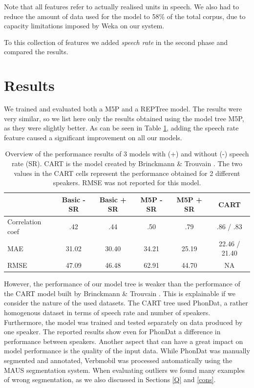 \documentclass[11pt,a4paper]{scrbook}
\begin{document}
Note that all features refer to actually realised units in speech. We also had to reduce the amount of data used for the model to 58\% of the total corpus, due to capacity limitations imposed by Weka on our system. 

To this collection of features we added \textit{speech rate} in the second phase and compared the results. 

\section{Results}
\label{chap_6:results}
We trained and evaluated both a M5P and a REPTree model. The results were very similar, so we list here only the results obtained using the model tree M5P, as they were slightly better. As can be seen in Table \ref{tab:perfM}, adding the speech rate feature caused a significant improvement on all our models. 

\begin{table}[htbp]
\centering
\begin{tabular}{|l|c|c|c|c|c|}

\hline
	 & Basic - SR & Basic + SR & M5P - SR & M5P + SR & CART\\
\hline
\hline
Correlation coef 		& .42  & .44 & .50 & .79 & .86 / .83\\
	\hline
MAE  &  31.02 & 30.40 & 34.21 & 25.19 & 22.46 / 21.40\\
	\hline
RMSE  &  47.09 & 46.48 & 62.91 & 44.70 & NA \\
	\hline
\end{tabular}
\vspace{4mm}
\caption{Overview of the performance results of 3 models with (+) and without (-) speech rate (SR). CART is the model created by Brinckmann \& Trouvain \cite{Brinckmann_2003}. The two values in the CART cells represent the performance obtained for 2 different speakers. RMSE was not reported for this model.} 
\label{tab:perfM}
\end{table}

However, the performance of our model tree is weaker than the performance of the CART model built by Brinckmann \& Trouvain \cite{Brinckmann_2003}. This is explainable if we consider the nature of the used datasets. The CART tree used PhonDat, a rather homogenous dataset in terms of speech rate and number of speakers. Furthermore, the model was trained and tested separately on data produced by one speaker. The reported results show even for PhonDat a difference in performance between speakers. Another aspect that can have a great impact on model performance is the quality of the input data. While PhonDat was manually segmented and annotated, Verbmobil was processed automatically using the MAUS segmentation system. When evaluating outliers we found many examples of wrong segmentation, as we also discussed in Sections \ref{Q} and \ref{cons}.
\end{document}
